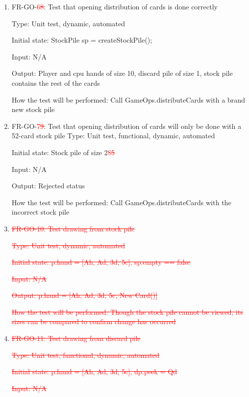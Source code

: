 \documentclass[12pt, titlepage]{article}
\begin{document}
\begin{enumerate}
    \item{FR-GO-\textcolor{red}{6\sout{8}}: Test that opening distribution of cards is done correctly}
    
    Type: Unit test, dynamic, automated
    
    Initial state: StockPile sp = createStockPile();
    
    Input: N/A
    
    Output: Player and cpu hands of size 10, discard pile of size 1, stock pile contains the rest of the cards
    
    How the test will be performed: Call GameOps.distributeCards with a brand new stock pile
    
    \item{FR-GO-\textcolor{red}{7\sout{9}}: Test that opening distribution of cards will only be done with a 52-card stock pile}
    Type: Unit test, functional, dynamic, automated
    
    Initial state: Stock pile of size 2\textcolor{red}{8\sout{5}}
    
    Input: N/A
    
    Output: Rejected status
    
    How the test will be performed: Call GameOps.distributeCards with the incorrect stock pile
    
    \item{\textcolor{red}{\sout{FR-GO-10: Test drawing from stock pile}}}
    
    \textcolor{red}{\sout{Type: Unit test, dynamic, automated}}
    
    \textcolor{red}{\sout{Initial state: p.hand = [Ah, Ad, 3d, 5c], sp.empty == false}}
    
    \textcolor{red}{\sout{Input: N/A}}
    
    \textcolor{red}{\sout{Output: p.hand = [Ah, Ad, 3d, 5c, New Card()]}}
    
    \textcolor{red}{\sout{How the test will be performed: Though the stock pile cannot be viewed, its sizes can be compared to confirm change has occurred}}
    
    \item{\textcolor{red}{\sout{FR-GO-11: Test drawing from discard pile}}}
    
    \textcolor{red}{\sout{Type: Unit test, functional, dynamic, automated}}
    
    \textcolor{red}{\sout{Initial state: p.hand = [Ah, Ad, 3d, 5c], dp.peek = Qd}}
    
    \textcolor{red}{\sout{Input: N/A}}
    

\end{enumerate}
\end{document}

